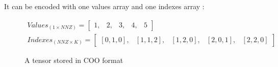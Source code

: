 It can be encoded with one values array and one indexes array :
\begin{figure}[h]
	\[
	\begin{aligned}
	Values_{(1\times NNZ)} = 
	\begin{bmatrix}
	1, &  2, & 3, & 4, & 5
	\end{bmatrix}
	\\
	Indexes_{(NNZ \times K)} = 
	\begin{bmatrix}
	[0, 1, 0] ,&  [1, 1, 2], & [1, 2, 0], & [2, 0, 1], & [2, 2, 0]
	\end{bmatrix}
	\end{aligned}
	\]
	\caption{A tensor stored in COO format}
		\label{fig:cooformattensor}
\end{figure}

